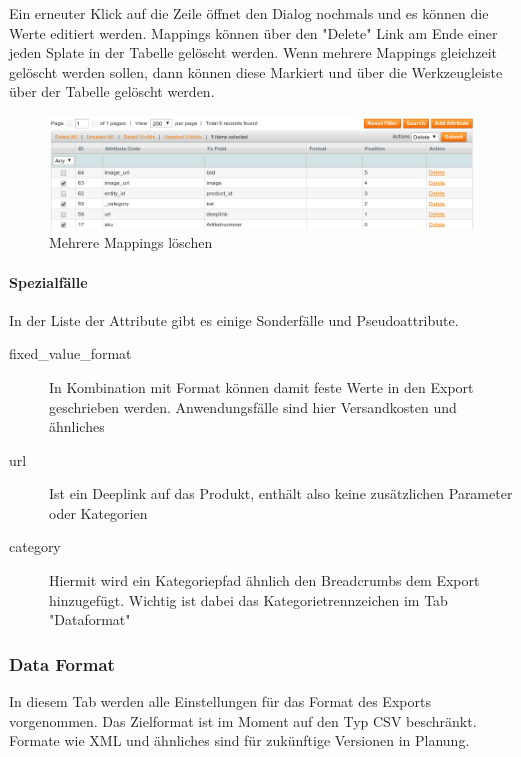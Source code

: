 \documentclass[a4paper,12pt]{book}
\begin{document}
Ein erneuter Klick auf die Zeile öffnet den Dialog nochmals und es
können die Werte editiert werden. Mappings können über den "Delete"
Link am Ende einer jeden Splate in der Tabelle gelöscht werden. Wenn
mehrere Mappings gleichzeit gelöscht werden sollen, dann können diese
Markiert und über die Werkzeugleiste über der Tabelle gelöscht werden.

\begin{figure}
 \includegraphics[width=1\textwidth]{img/bild07.png}
  \caption{Mehrere Mappings löschen}
  \label{figure:delete_massactions}
\end{figure}

\paragraph{Spezialfälle}
In der Liste der Attribute gibt es einige Sonderfälle und
Pseudoattribute.

\begin{description}

\item[fixed\_value\_format] In Kombination mit Format können damit feste
Werte in den Export geschrieben werden. Anwendungsfälle sind hier
Versandkosten und ähnliches

\item[url] Ist ein Deeplink auf das Produkt, enthält also keine
zusätzlichen Parameter oder Kategorien

\item[category] Hiermit wird ein Kategoriepfad ähnlich den Breadcrumbs
dem Export hinzugefügt. Wichtig ist dabei das Kategorietrennzeichen im
Tab "Dataformat"
\end{description}

\subsubsection{Data Format}
In diesem Tab werden alle Einstellungen für das Format des Exports
vorgenommen. Das Zielformat ist im Moment auf den Typ CSV beschränkt.
Formate wie XML und ähnliches sind für zukünftige Versionen in
Planung.
\end{document}
